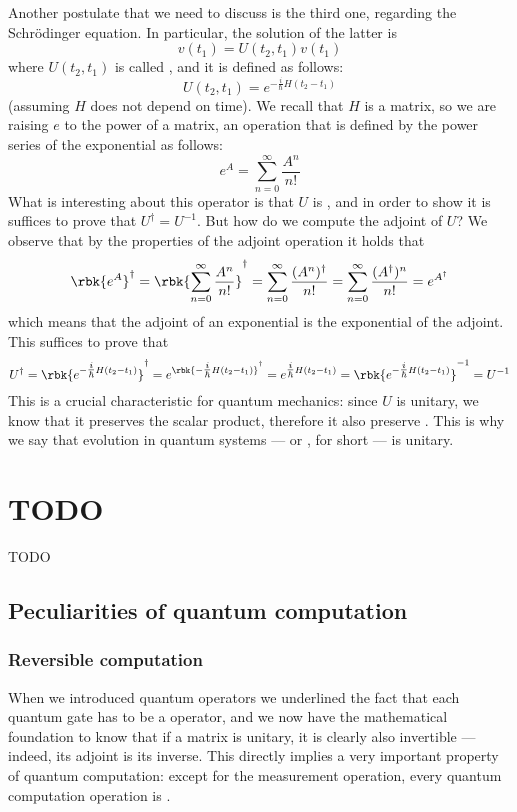 \documentclass[a4paper, 12pt]{report}
\begin{document}
Another postulate that we need to discuss is the third one, regarding the Schrödinger equation. In particular, the solution of the latter is $$v(t_1) = U(t_2, t_1)v(t_1)$$ where $U(t_2, t_1)$ is called , and it is defined as follows: $$U(t_2, t_1) = e^{-\tfrac{i}{\hbar}H(t_2 - t_1)}$$ (assuming $H$ does not depend on time). We recall that $H$ is a matrix, so we are raising $e$ to the power of a matrix, an operation that is defined by the power series of the exponential as follows: $$e^A = \sum_{n = 0}^\infty{\dfrac{A^n}{n!}}$$ What is interesting about this operator is that $U$ is , and in order to show it is suffices to prove that $U^\dag = U^{-1}$. But how do we compute the adjoint of $U$? We observe that by the properties of the adjoint operation it holds that $$\rbk{e^A}^\dag = \rbk{\sum_{n = 0}^\infty{\dfrac{A^n}{n!}}}^\dag = \sum_{n = 0}^\infty{\dfrac{(A^n)^\dag}{n!}} = \sum_{n = 0}^\infty{\dfrac{(A^\dag)^n}{n!}} = e^{A^\dag}$$ which means that the adjoint of an exponential is the exponential of the adjoint. This suffices to prove that $$U^\dag = \rbk{e^{-\tfrac{i}{\hbar}H(t_2 - t_1)}}^\dag = e^{\rbk{-\tfrac{i}{\hbar}H(t_2 - t_1)}^\dag} = e^{\tfrac{i}{\hbar}H(t_2 - t_1)} = \rbk{e^{-\tfrac{i}{\hbar}H(t_2 - t_1)}}^{-1} = U^{-1}$$ This is a crucial characteristic for quantum mechanics: since $U$ is unitary, we know that it preserves the scalar product, therefore it also preserve . This is why we say that evolution in quantum systems --- or , for short --- is unitary.

\chapter{TODO}

TODO 

\section{Peculiarities of quantum computation}

\subsection{Reversible computation}

When we introduced quantum operators we underlined the fact that each quantum gate has to be a  operator, and we now have the mathematical foundation to know that if a matrix is unitary, it is clearly also invertible --- indeed, its adjoint is its inverse. This directly implies a very important property of quantum computation: except for the measurement operation, every quantum computation operation is .
\end{document}
